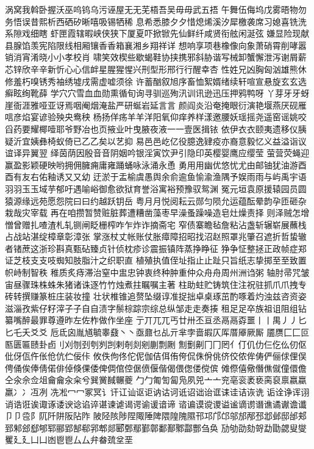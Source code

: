 涡窝我斡卧握沃巫呜钨乌污诬屋⽆无芜梧吾吴⽏毋武五捂
午舞伍侮坞戊雾晤物勿务悟误昔熙析西硒矽晰嘻吸锡牺稀
息希悉膝⼣夕惜熄烯溪汐犀檄袭席习媳喜铣洗系隙戏细瞎
虾匣霞辖暇峡侠狭下厦夏吓掀锨先仙鲜纤咸贤衔舷闲涎弦
嫌显险现献县腺馅羡宪陷限线相厢镶⾹香箱襄湘乡翔祥详
想响享项巷橡像向象萧硝霄削哮嚣销消宵淆晓⼩小孝校肖
啸笑效楔些歇蝎鞋协挟携邪斜胁谐写械卸蟹懈泄泻谢屑薪
芯锌欣⾟辛新忻⼼心信衅星腥猩惺兴刑型形邢⾏行醒幸杏
性姓兄凶胸匈汹雄熊休修羞朽嗅锈秀袖绣墟戌需虚嘘须徐
许蓄酗叙旭序畜恤絮婿绪续轩喧宣悬旋⽞玄选癣眩绚靴薛
学⽳穴雪⾎血勋熏循旬询寻驯巡殉汛训讯逊迅压押鸦鸭呀
丫芽⽛牙蚜崖衙涯雅哑亚讶焉咽阉烟淹盐严研蜒岩延⾔言
颜阎炎沿奄掩眼衍演艳堰燕厌砚雁唁彦焰宴谚验殃央鸯秧
杨扬佯疡⽺羊洋阳氧仰痒养样漾邀腰妖瑶摇尧遥窑谣姚咬
舀药要耀椰噎耶爷野冶也页掖业叶曳腋夜液⼀一壹医揖铱
依伊⾐衣颐夷遗移仪胰疑沂宜姨彝椅蚁倚已⼄乙矣以艺抑
易⾢邑屹亿役臆逸肄疫亦裔意毅忆义益溢诣议谊译异翼翌
绎茵荫因殷⾳音阴姻吟银淫寅饮尹引隐印英樱婴鹰应缨莹
萤营荧蝇迎赢盈影颖硬映哟拥佣臃痈庸雍踊蛹咏泳涌永恿
勇⽤用幽优悠忧尤由邮铀犹油游⾣酉有友右佑釉诱⼜又幼
迂淤于盂榆虞愚舆余俞逾鱼愉渝渔隅予娱⾬雨与屿禹宇语
⽻羽⽟玉域芋郁吁遇喻峪御愈欲狱育誉浴寓裕预豫驭鸳渊
冤元垣袁原援辕园员圆猿源缘远苑愿怨院⽈曰约越跃钥岳
粤⽉月悦阅耘云郧匀陨允运蕴酝晕韵孕匝砸杂栽哉灾宰载
再在咱攒暂赞赃脏葬遭糟凿藻枣早澡蚤躁噪造皂灶燥责择
则泽贼怎增憎曾赠扎喳渣札轧铡闸眨栅榨咋乍炸诈摘斋宅
窄债寨瞻毡詹粘沾盏斩辗崭展蘸栈占战站湛绽樟章彰漳张
掌涨杖丈帐账仗胀瘴障招昭找沼赵照罩兆肇召遮折哲蛰辙
者锗蔗这浙珍斟真甄砧臻贞针侦枕疹诊震振镇阵蒸挣睁征
狰争怔整拯正政帧症郑证芝枝⽀支吱蜘知肢脂汁之织职直
植殖执值侄址指⽌止趾只旨纸志挚掷⾄至致置帜峙制智秩
稚质炙痔滞治窒中盅忠钟衷终种肿重仲众⾈舟周州洲诌粥
轴肘帚咒皱宙昼骤珠株蛛朱猪诸诛逐⽵竹烛煮拄瞩嘱主著
柱助蛀贮铸筑住注祝驻抓⽖爪拽专砖转撰赚篆桩庄装妆撞
壮状椎锥追赘坠缀谆准捉拙卓桌琢茁酌啄着灼浊兹咨资姿
滋淄孜紫仔籽滓⼦子⾃自渍字鬃棕踪宗综总纵邹⾛走奏揍
租⾜足卒族祖诅阻组钻纂嘴醉最罪尊遵昨左佐柞做作坐座
亍丌兀兀丐廿卅丕亘丞⿀鬲孬噩⼁丨禺⼃丿⼔匕乇夭⽘爻
卮氐囟胤馗毓睾鼗⼂丶亟鼐乜乩亓芈孛啬嘏仄厍厝厣厥厮
靥赝⼕匚叵匦匮匾赜卦卣刂刈刎刭刳刿剀剌剞剡剜蒯剽劂
劁劐劓⼌冂罔亻仃仉仂仨仡仫仞伛仳伢佤仵伥伧伉伫佞佧
攸佚佝佟佗伲伽佶佴侑侉侃侏佾佻侪佼侬侔俦俨俪俅俚俣
俜俑俟俸倩偌俳倬倏倮倭俾倜倌倥倨偾偃偕偈偎偬偻傥傧
傩傺僖儆僭僬僦僮儇儋仝氽佘佥俎⿕龠汆籴兮巽黉馘冁夔
⼓勹匍訇匐凫夙兕⼇亠兖亳衮袤亵脔裒禀嬴蠃羸⼎冫冱冽
冼凇⼍冖冢冥讠讦讧讪讴讵讷诂诃诋诏诎诒诓诔诖诘诙诜
诟诠诤诨诩诮诰诳诶诹诼诿谀谂谄谇谌谏谑谒谔谕谖谙谛
谘谝谟谠谡谥谧谪谫谮谯谲谳谵谶⼙卩卺阝阢阡阱阪阽阼
陂陉陔陟陧陬陲陴隈隍隗隰邗邛邝邙邬邡邴邳邶邺邸邰郏
郅邾郐郄郇郓郦郢郜郗郛郫郯郾鄄鄢鄞鄣鄱鄯鄹酃酆刍奂
劢劬劭劾哿勐勖勰叟燮矍⼵廴⼐凵凼⾿鬯⼛厶弁畚巯坌垩

